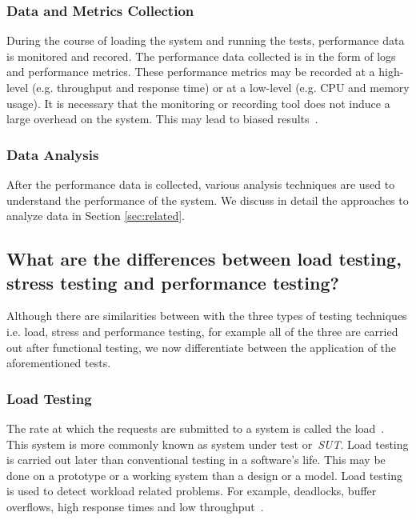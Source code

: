 \subsubsection{Data and Metrics Collection}

During the course of loading the system and running the tests, performance data is monitored and recored. The performance data collected is in the form of logs and performance metrics. These performance metrics may be recorded at a high-level (e.g. throughput and response time) or at a low-level (e.g. CPU and memory usage). It is necessary that the monitoring or recording tool does not induce a large overhead on the system. This may lead to biased results~\cite{mytkowicz2010evaluating}.

\subsubsection{Data Analysis}
After the performance data is collected, various analysis techniques are used to understand the performance of the system. We discuss in detail the approaches to analyze data in Section \ref{sec:related}.


\subsection{What are the differences between load testing, stress testing and performance testing?}

Although there are similarities between with the three types of testing techniques i.e. load, stress and performance testing, for example all of the three are carried out after functional testing, we now differentiate between the application of the aforementioned tests.

\subsubsection{Load Testing}

The rate at which the requests are submitted to a system is called the load~\cite{Beizer:1984}. This system is more commonly known as system under test or~\textit{SUT}. Load testing is carried out later than conventional testing in a software's life. This may be done on a prototype or a working system than a design or a model. Load testing is used to detect workload related problems. For example, deadlocks, buffer overflows, high response times and low throughput~\cite{464549,Barna:2011,6032540}. 

